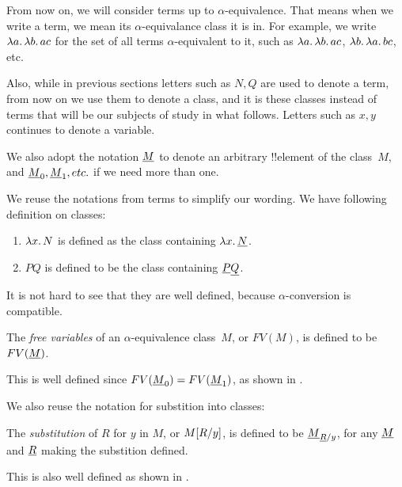 \documentclass[../../../include/open-logic-section]{subfiles}
\begin{document}

From now on, we will consider terms up to $\alpha$-equivalence.  That
means when we write a term, we mean its $\alpha$-equivalance class it
is in. For example, we write $\lambd[a][\lambd[b][a c]]$ for the set
of all terms $\alpha$-equivalent to it, such as $\lambd[a][\lambd[b][a
    c]]$, $\lambd[b][\lambd[a][b c]]$, etc.

Also, while in previous sections letters such as $N, Q$ are used to
denote a term, from now on we use them to denote a class, and it is
these classes instead of terms that will be our subjects of study in
what follows. Letters such as $x, y$ continues to denote a variable.

We also adopt the notation $\rep{M}$ to denote an arbitrary
!!{element} of the class~$M$, and $\rep{M}[0], \rep{M}[1], etc. $ if
we need more than one.

We reuse the notations from terms to simplify our wording. We
have following definition on classes:
\begin{defn}
  \begin{enumerate}
  \item $\lambd[x][N]$ is defined as the class containing
    $\lambd[x][\rep{N}]$.
  \item $PQ$ is defined to be the class containing $\rep{P}\rep{Q}$.
  \end{enumerate}
\end{defn}

It is not hard to see that they are well defined, because
$\alpha$-conversion is compatible.

\begin{defn} 
  The \emph{free variables} of an $\alpha$-equivalence class~$M$, or
  $FV(M)$, is defined to be $FV(\rep{M})$.
\end{defn}

This is well defined since $FV(\rep{M}[0]) =
FV(\rep{M}[1])$, as shown in .

We also reuse the notation for substition into classes:
\begin{defn} 
  The \emph{substitution} of $R$ for $y$ in $M$, or $M[R/y]$, is
  defined to be $\Subst{\rep{M}}{\rep{R}}{y}$, for any $\rep{M}$ and
  $\rep{R}$ making the substition defined.
\end{defn}

This is also well defined as shown in .
\end{document}
